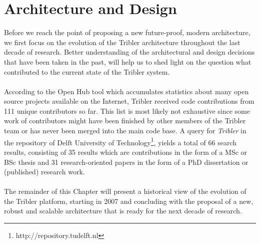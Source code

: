 \chapter{Architecture and Design}
\label{chapter:architecture}

Before we reach the point of proposing a new future-proof, modern architecture, we first focus on the evolution of the Tribler architecture throughout the last decade of research. Better understanding of the architectural and design decisions that have been taken in the past, will help us to shed light on the question what contributed to the current state of the Tribler system.\\\\
According to the Open Hub tool\cite{openhubtribler} which accumulates statistics about many open source projects available on the Internet, Tribler received code contributions from 111 unique contributors so far. This list is most likely not exhaustive since some work of contributors might have been finished by other members of the Tribler team or has never been merged into the main code base. A query for \emph{Tribler} in the repository of Delft University of Technology\footnote{http://repository.tudelft.nl}, yields a total of 66 search results, consisting of 35 results which are contributions in the form of a MSc or BSc thesis and 31 research-oriented papers in the form of a PhD dissertation or (published) research work.\\\\
The remainder of this Chapter will present a historical view of the evolution of the Tribler platform, starting in 2007 and concluding with the proposal of a new, robust and scalable architecture that is ready for the next decade of research.

